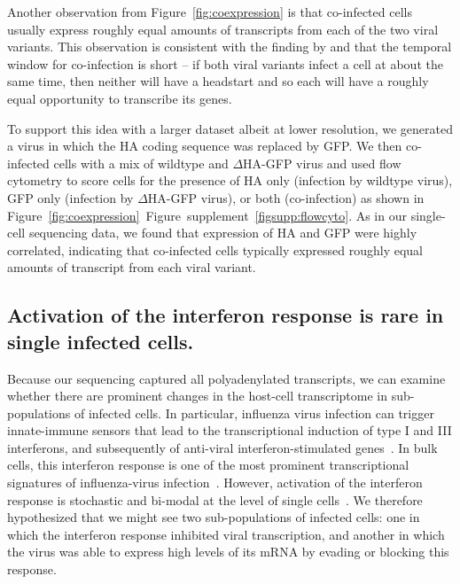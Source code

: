 \documentclass[9pt,lineno]{elife}
\begin{document}
Another observation from Figure~\ref{fig:coexpression} is that co-infected cells usually express roughly equal amounts of transcripts from each of the two viral variants.
This observation is consistent with the finding by \citet{Dou:2017cp} and \citet{Huang:2008gy} that the temporal window for co-infection is short -- if both viral variants infect a cell at about the same time, then neither will have a headstart and so each will have a roughly equal opportunity to transcribe its genes.

To support this idea with a larger dataset albeit at lower resolution, we generated a virus in which the HA coding sequence was replaced by GFP.
We then co-infected cells with a mix of wildtype and $\Delta$HA-GFP virus and used flow cytometry to score cells for the presence of HA only (infection by wildtype virus), GFP only (infection by $\Delta$HA-GFP virus), or both (co-infection) as shown in Figure~\ref{fig:coexpression}~Figure~supplement~\ref{figsupp:flowcyto}.
As in our single-cell sequencing data, we found that expression of HA and GFP were highly correlated, indicating that co-infected cells typically expressed roughly equal amounts of transcript from each viral variant.

\subsection{Activation of the interferon response is rare in single infected cells.}
Because our sequencing captured all polyadenylated transcripts, we can examine whether there are prominent changes in the host-cell transcriptome in sub-populations of infected cells.
In particular, influenza virus infection can trigger innate-immune sensors that lead to the transcriptional induction of type I and III interferons, and subsequently of anti-viral interferon-stimulated genes~\citep{Killip:2015dw,Iwasaki:2014dw,Crotta:2013ef}.
In bulk cells, this interferon response is one of the most prominent transcriptional signatures of influenza-virus infection~\citep{Geiss:2002a}.
However, activation of the interferon response is stochastic and bi-modal at the level of single cells~\citep{Chen:2010cr,Shalek:2014ey,Shalek:2013ej,PerezCidoncha:2014jr,bhushal2017cell}.
We therefore hypothesized that we might see two sub-populations of infected cells: one in which the interferon response inhibited viral transcription, and another in which the virus was able to express high levels of its mRNA by evading or blocking this response.
\end{document}
